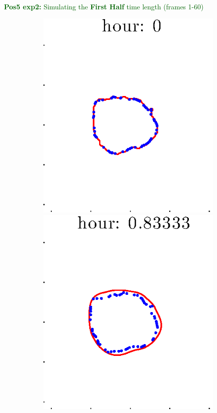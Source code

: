 \documentclass[12pt]{article}
\begin{document}
\clearpage

\noindent \textcolor{DarkGreen}{\textbf{Pos5 exp2:} Simulating the \textbf{First Half} time length (frames 1-60)}

\begin{figure}[h!]
\centering
	\begin{subfigure}[b]{.3\textwidth}
	\centering
		\includegraphics[height=.15\textheight]{Pos5exp2/firsthalf/full1.eps}
		\includegraphics[height=.15\textheight]{Pos5exp2/firsthalf/full2.eps}

\end{subfigure}
\end{figure}
\end{document}
